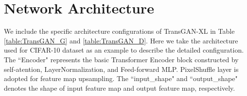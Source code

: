 \documentclass{article}
\begin{document}
\section{Network Architecture}
\label{sec:Appendix_B}
We include the specific architecture configurations of TransGAN-XL in Table \ref{table:TransGAN_G} and \ref{table:TransGAN_D}. Here we take the architecture used for CIFAR-10 dataset as an example to describe the detailed configuration. The ``Encoder" represents the basic Transformer Encoder block constructed by self-atention, LayerNormalization, and Feed-forward MLP. PixelShuffle layer is adopted for feature map upsampling. The ``input\_shape" and ``output\_shape" denotes the shape of input feature map and output feature map, respectively.
\begin{table}[h]
\caption{Specific configuration of the generator of TransGAN-XL}
\label{table:TransGAN_G}
\centering
\begin{center}
\begin{small}
\end{small}
\end{center}
\end{table}
\end{document}
